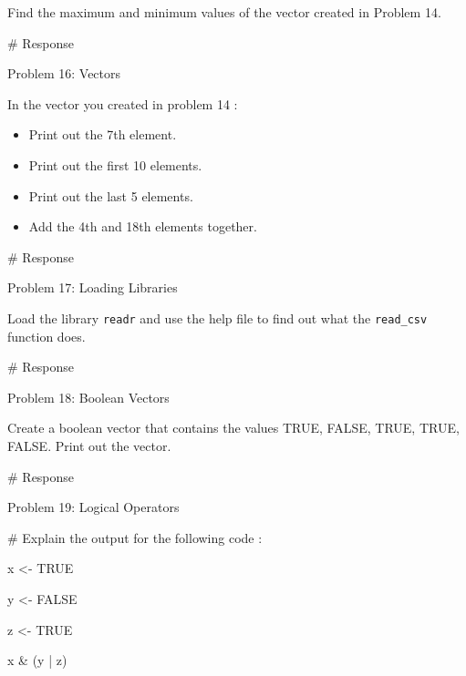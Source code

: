 \documentclass[
  letterpaper,
  DIV=11,
  numbers=noendperiod]{scrreprt}
\newenvironment{Shaded}{\begin{snugshade}}{\end{snugshade}}
\newcommand{\CommentTok}[1]{\textcolor[rgb]{0.37,0.37,0.37}{#1}}
\newcommand{\ConstantTok}[1]{\textcolor[rgb]{0.56,0.35,0.01}{#1}}
\newcommand{\NormalTok}[1]{\textcolor[rgb]{0.00,0.23,0.31}{#1}}
\newcommand{\OtherTok}[1]{\textcolor[rgb]{0.00,0.23,0.31}{#1}}
\newcommand{\SpecialCharTok}[1]{\textcolor[rgb]{0.37,0.37,0.37}{#1}}
\providecommand{\tightlist}{%
  \setlength{\itemsep}{0pt}\setlength{\parskip}{0pt}}\usepackage{longtable,booktabs,array}
\begin{document}
Find the maximum and minimum values of the vector created in Problem 14.

\begin{Shaded}
\begin{Highlighting}[]
\CommentTok{\# Response}
\end{Highlighting}
\end{Shaded}

Problem 16: Vectors

In the vector you created in problem 14 :

\begin{itemize}
\tightlist
\item
  Print out the 7th element.
\item
  Print out the first 10 elements.
\item
  Print out the last 5 elements.
\item
  Add the 4th and 18th elements together.
\end{itemize}

\begin{Shaded}
\begin{Highlighting}[]
\CommentTok{\# Response}
\end{Highlighting}
\end{Shaded}

Problem 17: Loading Libraries

Load the library \texttt{readr} and use the help file to find out what
the \texttt{read\_csv} function does.

\begin{Shaded}
\begin{Highlighting}[]
\CommentTok{\# Response}
\end{Highlighting}
\end{Shaded}

Problem 18: Boolean Vectors

Create a boolean vector that contains the values TRUE, FALSE, TRUE,
TRUE, FALSE. Print out the vector.

\begin{Shaded}
\begin{Highlighting}[]
\CommentTok{\# Response}
\end{Highlighting}
\end{Shaded}

Problem 19: Logical Operators

\begin{Shaded}
\begin{Highlighting}[]
\CommentTok{\# Explain the output for the following code :}

\NormalTok{x }\OtherTok{\textless{}{-}} \ConstantTok{TRUE}

\NormalTok{y }\OtherTok{\textless{}{-}} \ConstantTok{FALSE}

\NormalTok{z }\OtherTok{\textless{}{-}} \ConstantTok{TRUE}

\NormalTok{x }\SpecialCharTok{\&}\NormalTok{ (y }\SpecialCharTok{|}\NormalTok{ z)}
\end{Highlighting}
\end{Shaded}
\end{document}
